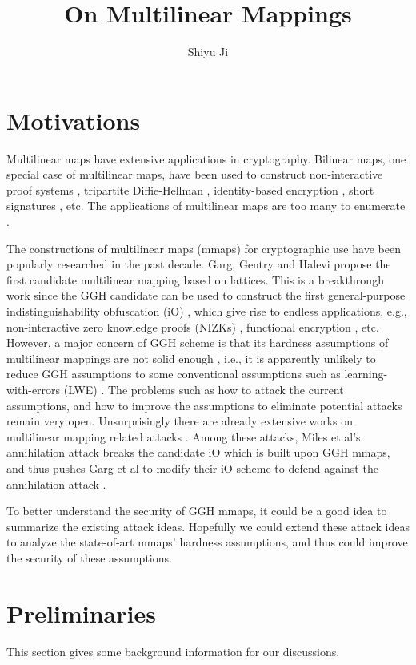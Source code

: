 \documentclass[10pt]{article}
\theoremstyle{plain}
\theoremstyle{definition}
\theoremstyle{remark}
\begin{document}
\title{On Multilinear Mappings}
\author{Shiyu Ji}
\maketitle

\section{Motivations}
Multilinear maps have extensive applications in cryptography. Bilinear maps, one special case of multilinear maps, have been used to construct non-interactive proof systems \cite{GS08}, tripartite Diffie-Hellman \cite{Joux00}, identity-based encryption \cite{BF01}, short signatures \cite{BLS01}, etc. The applications of multilinear maps are too many to enumerate \cite{GGH13a}. 

The constructions of multilinear maps (mmaps) for cryptographic use have been popularly researched in the past decade. Garg, Gentry and Halevi \cite{GGH13a} propose the first candidate multilinear mapping based on lattices. This is a breakthrough work since the GGH candidate can be used to construct the first general-purpose indistinguishability obfuscation (iO) \cite{GGH13b}, which give rise to endless applications, e.g., non-interactive zero knowledge proofs (NIZKs) \cite{SW14}, functional encryption \cite{GGH13b}, etc. However, a major concern of GGH scheme is that its hardness assumptions of multilinear mappings are not solid enough \cite{GGH13a}, i.e., it is apparently unlikely to reduce GGH assumptions to some conventional assumptions such as learning-with-errors (LWE) \cite{Reg09}. The problems such as how to attack the current assumptions, and how to improve the assumptions to eliminate potential attacks remain very open. Unsurprisingly there are already extensive works on multilinear mapping related attacks \cite{CGH15, HJ15, CDPR15, CJL16, MSZ16}. Among these attacks, Miles et al's annihilation attack \cite{MSZ16} breaks the candidate iO \cite{GGH13b} which is built upon GGH mmaps, and thus pushes Garg et al to modify their iO scheme to defend against the annihilation attack \cite{GMS16}.

To better understand the security of GGH mmaps, it could be a good idea to summarize the existing attack ideas. Hopefully we could extend these attack ideas to analyze the state-of-art mmaps' hardness assumptions, and thus could improve the security of these assumptions.

\section{Preliminaries}
This section gives some background information for our discussions.
\end{document}
